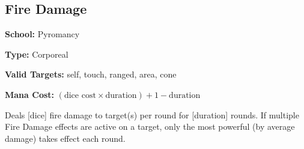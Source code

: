 \subsection*{Fire Damage}

\noindent
\textbf{School:} Pyromancy

\noindent
\textbf{Type:} Corporeal

\noindent
\textbf{Valid Targets:} self, touch, ranged, area, cone

\noindent
\textbf{Mana Cost:} $(\text{dice cost} \times \text{duration}) + \text{1} - \text{duration}$

Deals [dice] fire damage to target(s) per round for [duration] rounds. If
multiple Fire Damage effects are active on a target, only the most powerful (by
average damage) takes effect each round.
